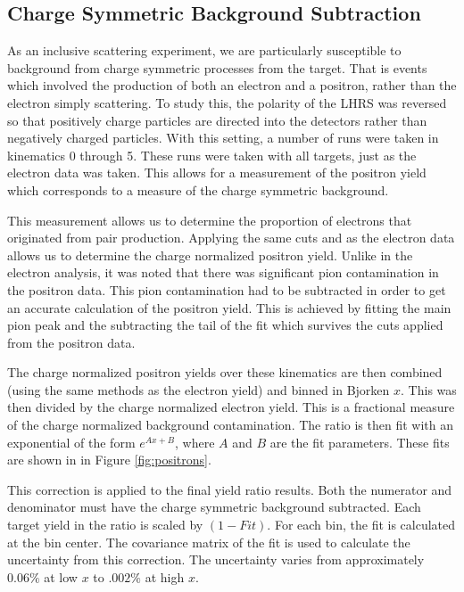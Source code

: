 \subsection{Charge Symmetric Background Subtraction}

As an inclusive scattering experiment, we are particularly susceptible to background from charge symmetric processes from the target. That is events which involved the production of both an electron and a positron, rather than the electron simply scattering. To study this, the polarity of the LHRS was reversed so that positively charge particles are directed into the detectors rather than negatively charged particles. With this setting, a number of runs were taken in kinematics 0 through 5. These runs were taken with all targets, just as the electron data was taken. This allows for a measurement of the positron yield which corresponds to a measure of the charge symmetric background.

This measurement allows us to determine the proportion of electrons that originated from pair production. Applying the same cuts and as the electron data allows us to determine the charge normalized positron yield. Unlike in the electron analysis, it was noted that there was significant pion contamination in the positron data. This pion contamination had to be subtracted in order to get an accurate calculation of the positron yield. This is achieved by fitting the main pion peak and the subtracting the tail of the fit which survives the cuts applied from the positron data.

The charge normalized positron yields over these kinematics are then combined (using the same methods as the electron yield) and binned in Bjorken $x$. This was then divided by the charge normalized electron yield. This is a fractional measure of the charge normalized background contamination. The ratio is then fit with an exponential of the form $e^{Ax + B}$, where $A$ and $B$ are the fit parameters. These fits are shown in in Figure \ref{fig:positrons}.

This correction is applied to the final yield ratio results. Both the numerator and denominator must have the charge symmetric background subtracted. Each target yield in the ratio is scaled by $\left(1 - Fit\right)$. For each bin, the fit is calculated at the bin center. The covariance matrix of the fit is used to calculate the uncertainty from this correction. The uncertainty varies from approximately $0.06\%$ at low $x$ to $.002\%$ at high $x$.

